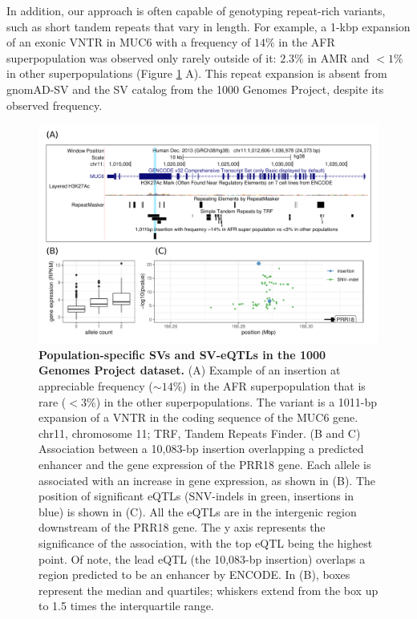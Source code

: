 \documentclass[11pt]{ucscthesis}
\begin{document}
In addition, our approach is often capable of genotyping repeat-rich variants, such as short tandem repeats that vary in length.
For example, a 1-kbp expansion of an exonic VNTR in MUC6 with a frequency of $14\%$ in the AFR superpopulation was observed only rarely outside of it: $2.3\%$ in AMR and $<1\%$ in other superpopulations (Figure \ref{fig:aim2_fig6} A).
This repeat expansion is absent from gnomAD-SV and the SV catalog from the 1000 Genomes Project, despite its observed frequency.

\begin{figure}
    \centering
    \includegraphics[width=\linewidth]{aim2_fig6.pdf}
    \caption[Population-specific SVs and SV-eQTLs in the 1000 Genomes Project dataset]{\textbf{Population-specific SVs and SV-eQTLs in the 1000 Genomes Project dataset.} (A) Example of an insertion at appreciable frequency ($\sim14\%$) in the AFR superpopulation that is rare ($<3\%$) in the other superpopulations. The variant is a 1011-bp expansion of a VNTR in the coding sequence of the MUC6 gene. chr11, chromosome 11; TRF, Tandem Repeats Finder. (B and C) Association between a 10,083-bp insertion overlapping a predicted enhancer and the gene expression of the PRR18 gene. Each allele is associated with an increase in gene expression, as shown in (B). The position of significant eQTLs (SNV-indels in green, insertions in blue) is shown in (C). All the eQTLs are in the intergenic region downstream of the PRR18 gene. The y axis represents the significance of the association, with the top eQTL being the highest point. Of note, the lead eQTL (the 10,083-bp insertion) overlaps a region predicted to be an enhancer by ENCODE. In (B), boxes represent the median and quartiles; whiskers extend from the box up to 1.5 times the interquartile range.}
    \label{fig:aim2_fig6}
\end{figure}
\end{document}
